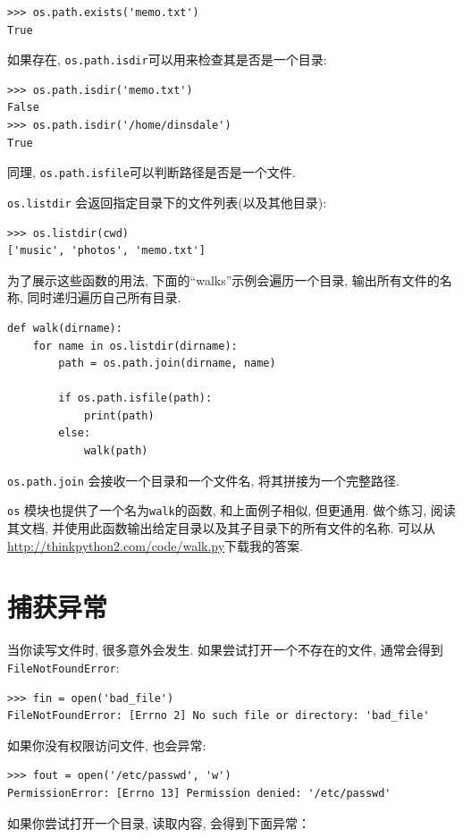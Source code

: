 \documentclass[10pt]{book}
\begin{document}
\begin{verbatim}
>>> os.path.exists('memo.txt')
True
\end{verbatim}
%
如果存在, {\tt os.path.isdir}可以用来检查其是否是一个目录:

\begin{verbatim}
>>> os.path.isdir('memo.txt')
False
>>> os.path.isdir('/home/dinsdale')
True
\end{verbatim}
%
同理, {\tt os.path.isfile}可以判断路径是否是一个文件. 

{\tt os.listdir} 会返回指定目录下的文件列表(以及其他目录):

\begin{verbatim}
>>> os.listdir(cwd)
['music', 'photos', 'memo.txt']
\end{verbatim}
%
为了展示这些函数的用法, 下面的``walks''示例会遍历一个目录, 
输出所有文件的名称, 同时递归遍历自己所有目录. 

\begin{verbatim}
def walk(dirname):
    for name in os.listdir(dirname):
        path = os.path.join(dirname, name)

        if os.path.isfile(path):
            print(path)
        else:
            walk(path)
\end{verbatim}
%

{\tt os.path.join} 会接收一个目录和一个文件名, 将其拼接为一个完整路径. 

{\tt os} 模块也提供了一个名为{\tt walk}的函数, 和上面例子相似, 但更通用. 
做个练习, 阅读其文档, 并使用此函数输出给定目录以及其子目录下的所有文件的名称. 
可以从\url{http://thinkpython2.com/code/walk.py}下载我的答案. 


\section{捕获异常}
\label{catch}

当你读写文件时, 很多意外会发生. 
如果尝试打开一个不存在的文件, 通常会得到{\tt FileNotFoundError}:

\begin{verbatim}
>>> fin = open('bad_file')
FileNotFoundError: [Errno 2] No such file or directory: 'bad_file'

\end{verbatim}
%
如果你没有权限访问文件, 也会异常:

\begin{verbatim}
>>> fout = open('/etc/passwd', 'w')
PermissionError: [Errno 13] Permission denied: '/etc/passwd'
\end{verbatim}
%
如果你尝试打开一个目录, 读取内容, 会得到下面异常：
\end{document}
